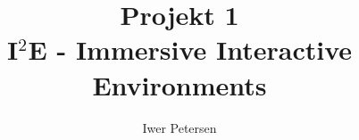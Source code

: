 \documentclass[twocolumn]{article}
\title{Projekt 1\\I$^2$E - Immersive Interactive Environments}
\author{Iwer Petersen}
\begin{document}
	\onecolumn
	\maketitle
	\newpage
	
	\tableofcontents
	\newpage
	
	\twocolumn
	
	
	
	
	
	
	\onecolumn
	\newpage	
	{}
	
\end{document}
